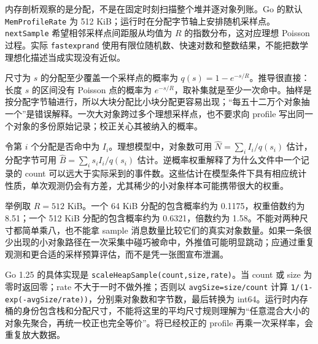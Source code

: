 \documentclass[UTF8,fontset=fandol,openany,11pt]{ctexbook}
\begin{document}
\begin{center}
\begin{minipage}{\linewidth}
\end{minipage}\end{center}

内存剖析观察的是分配，不是在固定时刻扫描整个堆并逐对象列账。Go 的默认 \texttt{Mem\allowbreak{}Profile\allowbreak{}Rate} 为 512 KiB；运行时在分配字节轴上安排随机采样点。\texttt{nextSample} 希望相邻采样点间距服从均值为 \(R\) 的指数分布，这对应理想 Poisson 过程。实际 \texttt{fastexprand} 使用有限位随机数、快速对数和整数结果，不能把数学理想化描述当成实现没有近似。\cite{pp-heap-poisson}\cite{pp-mprof}


尺寸为 \(s\) 的分配至少覆盖一个采样点的概率为 \(q(s)=1-e^{-s/R}\)。推导很直接：长度 \(s\) 的区间没有 Poisson 点的概率为 \(e^{-s/R}\)，取补集就是至少一次命中。抽样是按分配字节轴进行，所以大块分配比小块分配更容易出现；“每五十二万个对象抽一个”是错误解释。一次大对象跨过多个理想采样点，也不要求向 profile 写出同一个对象的多份原始记录；校正关心其被纳入的概率。\cite{pp-heap-poisson}\cite{pp-heap-scale}


令第 \(i\) 个分配是否命中为 \(I_i\)。理想模型中，对象数可用 \(\widehat N=\sum_i I_i/q(s_i)\) 估计，分配字节可用 \(\widehat B=\sum_i s_iI_i/q(s_i)\) 估计。逆概率权重解释了为什么文件中一个记录的 count 可以远大于实际采到的事件数。这些估计在模型条件下具有相应统计性质，单次观测仍会有方差，尤其稀少的小对象样本可能携带很大的权重。\cite{pp-heap-scale}


举例取 \(R=512\) KiB。一个 64 KiB 分配的包含概率约为 0.1175，权重倍数约为 8.51；一个 512 KiB 分配的包含概率约为 0.6321，倍数约为 1.58。不能对两种尺寸都简单乘八，也不能拿 sample 消息数量比较它们的真实对象数量。如果一条很少出现的小对象路径在一次采集中碰巧被命中，外推值可能明显跳动；应通过重复观测和更合适的采样预算评估，而不是凭一张图宣布泄漏。\cite{pp-heap-scale}


Go 1.25 的具体实现是 \texttt{scaleHeapSample(count,\allowbreak{}size,\allowbreak{}rate)}。当 count 或 size 为零时返回零；rate 不大于一时不做外推；否则以 \texttt{avgSize=size/\allowbreak{}count} 计算 \texttt{1/\allowbreak{}(1-\allowbreak{}exp(-\allowbreak{}avgSize/\allowbreak{}rate))}，分别乘对象数和字节数，最后转换为 int64。运行时内存桶的身份包含栈和分配尺寸，不能将这里的平均尺寸规则理解为“任意混合大小的对象先聚合，再统一校正也完全等价”。将已经校正的 profile 再乘一次采样率，会重复放大数据。\cite{pp-heap-scale}\cite{pp-mprof}
\end{document}
